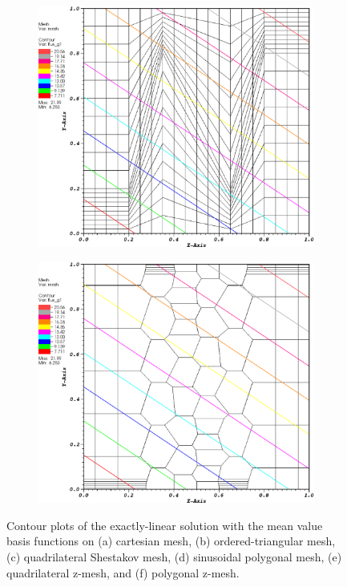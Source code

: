 \begin{figure}
\begin{subfigure}[b]{0.45\textwidth}
		\caption{}
	\end{subfigure}
	\vfill
	\begin{subfigure}[b]{0.45\textwidth}
		\centering
		\label{subfig::z_quad_mv_lin_sol}
		\includegraphics[width=\textwidth]{figures/sec_BF/z_quad_MV_k1.eps}
		\caption{}
	\end{subfigure}
	\hfill
	\begin{subfigure}[b]{0.45\textwidth}
		\centering
		\label{subfig::z_poly_mv_lin_sol}
		\includegraphics[width=\textwidth]{figures/sec_BF/z_poly_MV_k1.eps}
		\caption{}
	\end{subfigure}
\caption{Contour plots of the exactly-linear solution with the mean value basis functions on (a) cartesian mesh, (b) ordered-triangular mesh, (c) quadrilateral Shestakov mesh, (d) sinusoidal polygonal mesh, (e) quadrilateral z-mesh, and (f) polygonal z-mesh.}
\label{fig::BF_Results_Linear_mv_sol}
\end{figure}

